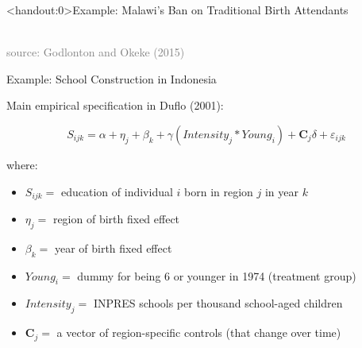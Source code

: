 \documentclass[10pt,xcolor=table,ignorenonframetext,aspectratio=169]{beamer}
\newlength{\wideitemsep}
\let\olditem\item
\renewcommand{\item}{\setlength{\itemsep}{\wideitemsep}\olditem}
\begin{document}
\begin{frame}<handout:0>{Example:  Malawi's Ban on Traditional Birth Attendants}

\medskip
\begin{center}
	 \\
	\textcolor{gray}{\tiny{source:  Godlonton and Okeke (2015)}}
\end{center}

\end{frame}



\begin{frame}{Example:  School Construction in Indonesia}

\medskip
Main empirical specification in Duflo (2001):
\begin{small}
	\begin{equation*}
	S_{ijk} = \alpha + \eta_j + \beta_k + \gamma \left( Intensity_j * Young_i \right) + \bm{C}_j \delta + \varepsilon_{ijk}
	\end{equation*}
\end{small}

\vspace{-0.5cm}

where:

\medskip
\begin{small}
\begin{itemize}
	
	\item $S_{ijk} = $ education of individual $i$ born in region $j$ in year $k$
	
	\item $\eta_j = $ region of birth fixed effect
	
	\item $\beta_k = $ year of birth fixed effect
	
	\item $ Young_i = $ dummy for being 6 or younger in 1974 (treatment group)
	
	\item $Intensity_j = $ INPRES schools per thousand school-aged children
	
	\item $ \bm{C}_j = $ a vector of region-specific controls (that change over time)
	
\end{itemize}
\end{small}

\end{frame}
\end{document}
